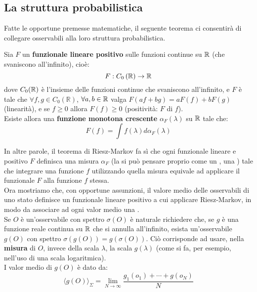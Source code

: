 \documentclass[FisicaTeorica.tex]{subfiles}
\begin{document}
\subsection{La struttura probabilistica}
Fatte le opportune premesse matematiche, il seguente teorema ci consentirà di collegare osservabili alla loro struttura probabilistica.
\begin{thm}
Sia $F$ un \textbf{funzionale lineare positivo} sulle funzioni continue su $\mathbb{R}$ (che svaniscono all'infinito), cioè:
\[
F:C_0\left(\mathbb{R}\right)\to \mathbb{R} 
\]
dove $C_0(\mathbb{R})$ è l'insieme delle funzioni continue che svaniscono all'infinito, e $F$ è tale che $\forall f,g\in C_0\left(\mathbb{R}\right)$, $\forall a,b\in \mathbb{R}$ valga $F\left(af+bg\right)=aF\left(f\right)+bF(g)$ (linearità), e se $f\geq 0$ allora $F\left(f\right)\geq 0$ (positività: $F$  di $f$).\\
Esiste allora una \textbf{funzione monotona crescente} $\alpha_F\left(\lambda\right)$ su $\mathbb{R}$ tale che: 
\[
F\left(f\right)=\int f\left(\lambda\right)d\alpha_F\left(\lambda\right)
\]
\end{thm}
In altre parole, il teorema di Riesz-Markov fa sì che ogni funzionale lineare e positivo $F$ definisca una misura $\alpha_F$ (la si può pensare proprio come un , una ) tale che integrare una funzione $f$ utilizzando quella misura equivale ad applicare il funzionale $F$ alla funzione $f$ stessa.\\
Ora mostriamo che, con opportune assunzioni, il valore medio delle osservabili di uno stato definisce un funzionale lineare positivo a cui applicare Riesz-Markov, in modo da associare ad ogni valor medio una .\\
Se $O$ è un'osservabile con spettro $\sigma \left(O\right)$ è naturale richiedere che, se $g$ è una funzione reale continua su $\mathbb{R}$ che si annulla all'infinito, esista un'osservabile $g(O)$ con spettro $\sigma \left(g\left(O\right)\right)=g\left(\sigma\left(O\right)\right)$. Ciò corrisponde ad usare, nella \textbf{misura} di $O$, invece della scala $\lambda$, la scala $g\left(\lambda\right)$ (come si fa, per esempio, nell'uso di una scala logaritmica).\\
I valor medio di $g(O)$ è dato da:
\begin{equation}
\langle g (O)\rangle_\Sigma = \lim_{N\to\infty} \frac{g_1(o_1) + \cdots + g(o_N)}{N}
    \label{eqn:medio-g}
\end{equation}
\end{document}
